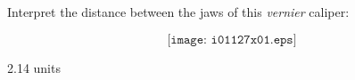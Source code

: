 

Interpret the distance between the jaws of this {\it vernier} caliper:

$$\texttt{[image: i01127x01.eps]}$$








2.14 units
 











